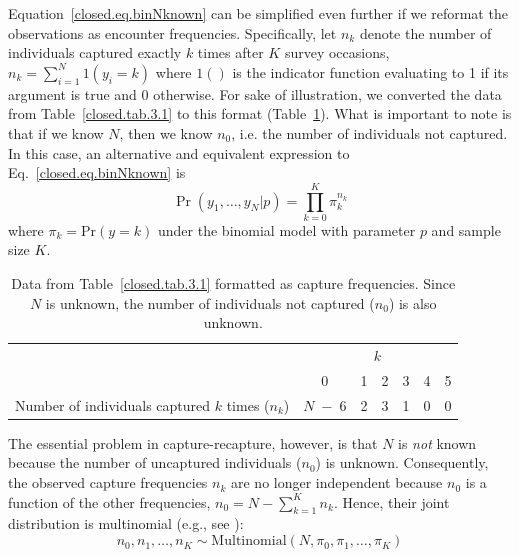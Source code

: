 Equation~\ref{closed.eq.binNknown} can be simplified even further if
we reformat the 
observations as encounter
 frequencies.
Specifically, let $n_k$ denote the number
of individuals captured exactly $k$ times after $K$ survey occasions, $n_k = \sum_{i=1}^N
1(y_i = k)$ where $1()$ is the indicator function evaluating to 1 if its
argument is true and 0 otherwise. For sake of illustration,
we converted the data from Table~\ref{closed.tab.3.1} to this
format (Table~\ref{closed.tab.3.1.nk}). What is important to note is
that if we know $N$, then we know $n_0$, i.e. the number of
individuals not captured. In this case, an alternative and equivalent expression to
Eq.~\ref{closed.eq.binNknown} is
\begin{equation}
  \Pr(y_1, \ldots, y_N | p) = \prod_{k=0}^K  \pi_{k}^{n_k}
  \label{closed.eq.multiNknown}
\end{equation}
where $\pi_{k} = \mathrm{Pr}(y=k)$ under the binomial model with
parameter $p$ and sample size $K$.
\begin{table}[ht]
\centering
\caption{Data from Table~\ref{closed.tab.3.1} formatted as capture
  frequencies. Since $N$ is unknown, the number of individuals not
  captured ($n_0$) is also unknown.}
\begin{tabular}{lcccccc}
\hline
& \multicolumn{6}{c}{$k$} \\
\cline{2-7}
 & 0  & 1 & 2 & 3 & 4 & 5 \\
\hline
Number of individuals captured $k$ times ($n_k$) & $N\; - \; 6$ & 2 & 3 & 1 & 0 & 0 \\
\hline
\end{tabular}
\label{closed.tab.3.1.nk}
\end{table}
The essential problem in capture-recapture, however, is that $N$ is
{\it not} known because the number of uncaptured
individuals ($n_0$)
is unknown. %
Consequently, the observed capture frequencies $n_k$ are no
longer independent because $n_0$ is a function of the other
frequencies, $n_0 = N-\sum_{k=1}^K n_k$. Hence, their joint distribution is multinomial
(e.g., see \citet[][p. 61]{illian_etal:2008}):
\begin{equation}
    n_0, n_1, \ldots, n_K \sim \mathrm{Multinomial}(N, \pi_0, \pi_1, \ldots, \pi_K)
\label{closed.eq.multinomial4m0}
\end{equation}
